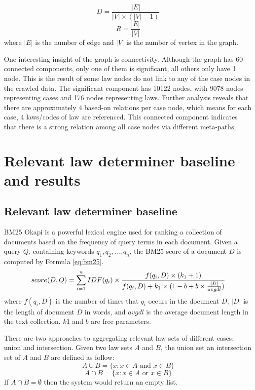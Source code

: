 \documentclass[conference]{IEEEtran}
\begin{document}
\begin{equation}
    D = \frac{|E|}{|V|\times(|V| - 1)}
    \label{eq:density}
\end{equation}
\begin{equation}
    R = \frac{|E|}{|V|}
    \label{eq:ratio}
\end{equation}
where $|E|$ is the number of edge and $|V|$ is the number of vertex in the graph.

One interesting insight of the graph is connectivity. Although the graph has 60 connected components, only one of them is significant, all others only have 1 node. This is the result of some law nodes do not link to any of the case nodes in the crawled data.
The significant component has 10122 nodes, with 9078 nodes representing cases and 176 nodes representing laws. Further analysis reveals that there are approximately 4 based-on relations per case node, which means for each case, 4 laws/codes of law are referenced.
This connected component indicates that there is a strong relation among all case nodes via different meta-paths.

\section{Relevant law determiner baseline and results}
\subsection{Relevant law determiner baseline}

BM25 Okapi is a powerful lexical engine used for ranking a collection of documents based on the frequency of query terms in each document. 
Given a query $Q$, containing keywords $q_1,q_2,\dots,q_n$, the BM25 score of a document $D$ is computed by Formula \ref{eq:bm25}.
\begin{equation}
    \footnotesize
    score(D,Q)=\sum_{i=1}^n IDF(q_i) \times \frac{f(q_i,D)\times(k_1+1)}{f(q_i,D)+k_1\times (1-b+b\times \frac{|D|}{avgdl})}
    \label{eq:bm25}
\end{equation}
where $f(q_i,D)$ is the number of times that $q_i$ occurs in the document $D$, $|D|$ is the length of document $D$ in words, and $avgdl$ is the average document length in the text collection, $k1$ and $b$ are free parameters.

There are two approaches to aggregating relevant law sets of different cases: union and intersection. Given two law sets $A$ and $B$, the union set an intersection set of $A$ and $B$ are defined as follow:
\[A \cup B = \{x : x \in A \text{ and } x \in B\}\]
\[A \cap B = \{x : x \in A \text{ or } x \in B\}\]
If $A \cap B = \emptyset$ then the system would return an empty list.
\end{document}
